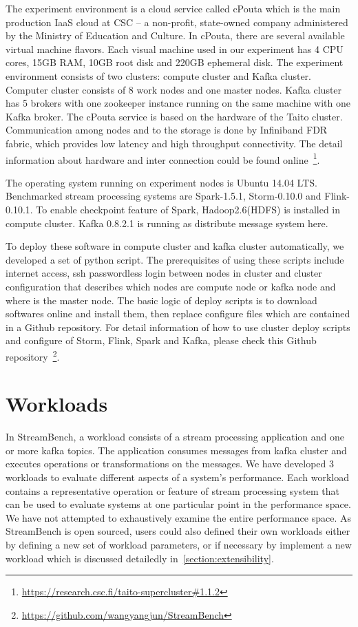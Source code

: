 The experiment environment is a cloud service called cPouta which is the main production IaaS cloud at CSC -- a non-profit, state-owned company administered by the Ministry of Education and Culture. In cPouta,  there are several available virtual machine flavors. Each visual machine used in our experiment has 4 CPU cores, 15GB RAM, 10GB root disk and 220GB ephemeral disk. The experiment environment consists of two clusters: compute cluster and Kafka cluster. Computer cluster consists of 8 work nodes and one master nodes. Kafka cluster has 5 brokers with one zookeeper instance running on the same machine with one Kafka broker. The cPouta service is based on the hardware of the Taito cluster. Communication among nodes and to the storage is done by Infiniband FDR fabric, which provides low latency and high throughput connectivity. The detail information about hardware and inter connection could be found online~\footnote{\url{https://research.csc.fi/taito-supercluster\#1.1.2}}.

The operating system running on experiment nodes is Ubuntu 14.04 LTS. Benchmarked stream processing systems are Spark-1.5.1, Storm-0.10.0 and Flink-0.10.1. To enable checkpoint feature of Spark, Hadoop2.6(HDFS) is installed in compute cluster. Kafka 0.8.2.1 is running as distribute message system here. 

To deploy these software in compute cluster and kafka cluster automatically, we developed a set of python script. The prerequisites of using these scripts include internet access, ssh passwordless login between nodes in cluster and cluster configuration that describes which nodes are compute node or kafka node and where is the master node. The basic logic of deploy scripts is to download softwares online and install them, then replace configure files which are contained in a Github repository. For detail information of how to use cluster deploy scripts and configure of Storm, Flink, Spark and Kafka, please check this Github repository~\footnote{\url{https://github.com/wangyangjun/StreamBench}}.

\section{Workloads}
\label{section:workloads}

In StreamBench, a workload consists of a stream processing application and one or more kafka topics. The application consumes messages from kafka cluster and executes operations or transformations on the messages. We have developed 3 workloads to evaluate different aspects of a system's performance. Each workload contains a representative operation or feature of stream processing system that can be used to evaluate systems at one particular point in the performance space. We have not attempted to exhaustively examine the entire performance space. As StreamBench is open sourced, users could also defined their own workloads either by defining a new set of workload parameters, or if necessary by implement a new workload which is discussed detailedly in~\cref{section:extensibility}.


